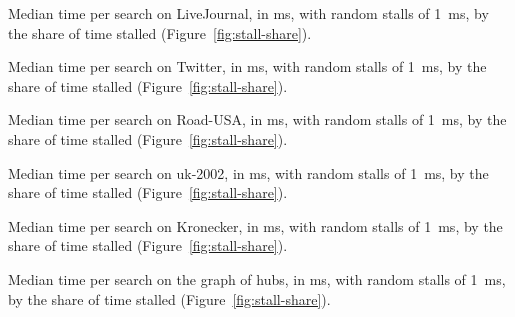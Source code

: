 \begin{table}[H]
    \caption{Median time per search on LiveJournal, in ms, with random stalls of 1~ms, by the share of time stalled (Figure~\ref{fig:stall-share}).}
    \label{tab:app-share-lj}
    \centering
\end{table}

\begin{table}[H]
    \caption{Median time per search on Twitter, in ms, with random stalls of 1~ms, by the share of time stalled (Figure~\ref{fig:stall-share}).}
    \label{tab:app-share-twitter}
    \centering
\end{table}

\begin{table}[H]
    \caption{Median time per search on Road-USA, in ms, with random stalls of 1~ms, by the share of time stalled (Figure~\ref{fig:stall-share}).}
    \label{tab:app-share-road}
    \centering
\end{table}

\begin{table}[H]
    \caption{Median time per search on uk-2002, in ms, with random stalls of 1~ms, by the share of time stalled (Figure~\ref{fig:stall-share}).}
    \label{tab:app-share-uk}
    \centering
\end{table}

\begin{table}[H]
    \caption{Median time per search on Kronecker, in ms, with random stalls of 1~ms, by the share of time stalled (Figure~\ref{fig:stall-share}).}
    \label{tab:app-share-kron}
    \centering
\end{table}

\begin{table}[H]
    \caption{Median time per search on the graph of hubs, in ms, with random stalls of 1~ms, by the share of time stalled (Figure~\ref{fig:stall-share}).}
    \label{tab:app-share-hubs}
    \centering
\end{table}

\clearpage
